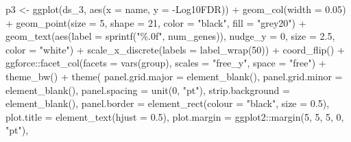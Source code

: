 \documentclass[
  11pt,
  oneside]{book}
\newenvironment{Shaded}{\begin{snugshade}}{\end{snugshade}}
\newcommand{\AttributeTok}[1]{\textcolor[rgb]{0.77,0.63,0.00}{#1}}
\newcommand{\DecValTok}[1]{\textcolor[rgb]{0.00,0.00,0.81}{#1}}
\newcommand{\FloatTok}[1]{\textcolor[rgb]{0.00,0.00,0.81}{#1}}
\newcommand{\FunctionTok}[1]{\textcolor[rgb]{0.00,0.00,0.00}{#1}}
\newcommand{\NormalTok}[1]{#1}
\newcommand{\OtherTok}[1]{\textcolor[rgb]{0.56,0.35,0.01}{#1}}
\newcommand{\SpecialCharTok}[1]{\textcolor[rgb]{0.00,0.00,0.00}{#1}}
\newcommand{\StringTok}[1]{\textcolor[rgb]{0.31,0.60,0.02}{#1}}
\begin{document}
\begin{Shaded}
\begin{Highlighting}[]
\NormalTok{p3 }\OtherTok{\textless{}{-}} \FunctionTok{ggplot}\NormalTok{(ds\_3, }\FunctionTok{aes}\NormalTok{(}\AttributeTok{x =}\NormalTok{ name, }\AttributeTok{y =} \StringTok{\textasciigrave{}}\AttributeTok{{-}Log10FDR}\StringTok{\textasciigrave{}}\NormalTok{)) }\SpecialCharTok{+}
  \FunctionTok{geom\_col}\NormalTok{(}\AttributeTok{width =} \FloatTok{0.05}\NormalTok{) }\SpecialCharTok{+}
  \FunctionTok{geom\_point}\NormalTok{(}\AttributeTok{size =} \DecValTok{5}\NormalTok{, }\AttributeTok{shape =} \DecValTok{21}\NormalTok{, }\AttributeTok{color =} \StringTok{"black"}\NormalTok{, }\AttributeTok{fill =} \StringTok{"grey20"}\NormalTok{) }\SpecialCharTok{+}
  \FunctionTok{geom\_text}\NormalTok{(}\FunctionTok{aes}\NormalTok{(}\AttributeTok{label =} \FunctionTok{sprintf}\NormalTok{(}\StringTok{"\%.0f"}\NormalTok{, num\_genes)), }\AttributeTok{nudge\_y =} \DecValTok{0}\NormalTok{, }\AttributeTok{size =} \FloatTok{2.5}\NormalTok{, }\AttributeTok{color =} \StringTok{"white"}\NormalTok{) }\SpecialCharTok{+}
  \FunctionTok{scale\_x\_discrete}\NormalTok{(}\AttributeTok{labels =} \FunctionTok{label\_wrap}\NormalTok{(}\DecValTok{50}\NormalTok{)) }\SpecialCharTok{+}
  \FunctionTok{coord\_flip}\NormalTok{() }\SpecialCharTok{+}
\NormalTok{  ggforce}\SpecialCharTok{::}\FunctionTok{facet\_col}\NormalTok{(}\AttributeTok{facets =} \FunctionTok{vars}\NormalTok{(group), }\AttributeTok{scales =} \StringTok{"free\_y"}\NormalTok{, }\AttributeTok{space =} \StringTok{"free"}\NormalTok{) }\SpecialCharTok{+}
  \FunctionTok{theme\_bw}\NormalTok{() }\SpecialCharTok{+}
  \FunctionTok{theme}\NormalTok{(}
    \AttributeTok{panel.grid.major =} \FunctionTok{element\_blank}\NormalTok{(),}
    \AttributeTok{panel.grid.minor =} \FunctionTok{element\_blank}\NormalTok{(),}
    \AttributeTok{panel.spacing =} \FunctionTok{unit}\NormalTok{(}\DecValTok{0}\NormalTok{, }\StringTok{"pt"}\NormalTok{),}
    \AttributeTok{strip.background =} \FunctionTok{element\_blank}\NormalTok{(),}
    \AttributeTok{panel.border =} \FunctionTok{element\_rect}\NormalTok{(}\AttributeTok{colour =} \StringTok{"black"}\NormalTok{, }\AttributeTok{size =} \FloatTok{0.5}\NormalTok{),}
    \AttributeTok{plot.title =} \FunctionTok{element\_text}\NormalTok{(}\AttributeTok{hjust =} \FloatTok{0.5}\NormalTok{),}
    \AttributeTok{plot.margin =}\NormalTok{ ggplot2}\SpecialCharTok{::}\FunctionTok{margin}\NormalTok{(}\DecValTok{5}\NormalTok{, }\DecValTok{5}\NormalTok{, }\DecValTok{5}\NormalTok{, }\DecValTok{0}\NormalTok{, }\StringTok{"pt"}\NormalTok{),}

\end{Highlighting}
\end{Shaded}
\end{document}
